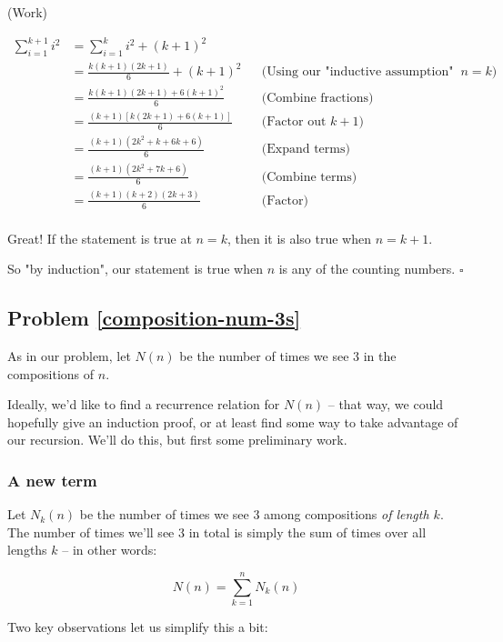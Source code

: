 (Work)

\begin{align*}
\sum_{i=1}^{k+1} i^2 &= \sum_{i=1}^{k} i^2 + (k+1)^2 \\
&= \frac{k(k+1)(2k+1)}{6} + (k+1)^2 && \text{(Using our "inductive assumption" that the statement is true at $n = k$)} \\
&= \frac{k(k+1)(2k+1) + 6(k+1)^2}{6} && \text{(Combine fractions)} \\
&= \frac{(k+1)\left[k(2k+1) + 6(k+1)\right]}{6} && \text{(Factor out $k+1$)} \\
&= \frac{(k+1)(2k^2 + k + 6k + 6)}{6} && \text{(Expand terms)} \\
&= \frac{(k+1)(2k^2 + 7k + 6)}{6} && \text{(Combine terms)} \\
&= \frac{(k+1)(k+2)(2k+3)}{6} && \text{(Factor)} \\
\end{align*}

Great! If the statement is true at $n = k$, then it is also true when $n = k + 1$. 

So "by induction", our statement is true when $n$ is any of the counting numbers. $\square$

\subsection{Problem \ref{composition-num-3s}}

As in our problem, let $N(n)$ be the number of times we see 3 in the compositions of $n$. 

Ideally, we'd like to find a recurrence relation for $N(n)$ -- that way, we could hopefully give an induction proof, or at least find some way to take advantage of our recursion. We'll do this, but first some preliminary work.

\subsubsection{A new term}

Let $N_k(n)$ be the number of times we see 3 among compositions \emph{of length $k$}. The number of times we'll see 3 in total is simply the sum of times over all lengths $k$ -- in other words:

\begin{equation*}
N(n) = \sum_{k=1}^{n} N_k(n)
\end{equation*}

Two key observations let us simplify this a bit:

